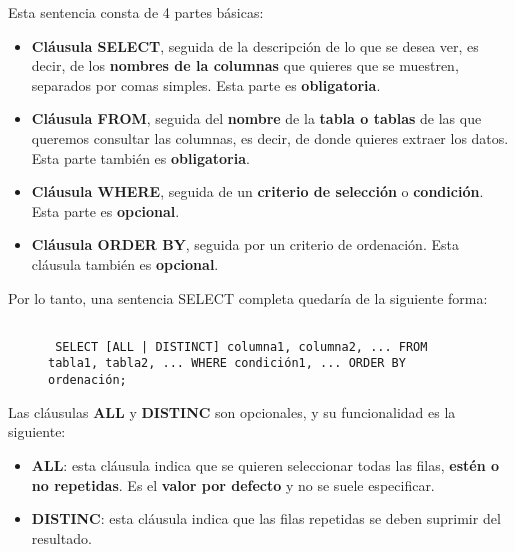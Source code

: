 Esta sentencia consta de 4 partes básicas:

\begin{itemize}
    \item \textbf{Cláusula SELECT}, seguida de la descripción de lo que se desea ver, es decir, de los \textbf{nombres de la columnas} que quieres que se muestren, separados por comas simples. Esta parte es \textbf{obligatoria}.

    \item \textbf{Cláusula FROM}, seguida del \textbf{nombre} de la \textbf{tabla o tablas} de las que queremos consultar las columnas, es decir, de donde quieres extraer los datos. Esta parte también es \textbf{obligatoria}.

    \item \textbf{Cláusula WHERE}, seguida de un \textbf{criterio de selección} o \textbf{condición}. Esta parte es \textbf{opcional}.

    \item \textbf{Cláusula ORDER BY}, seguida por un criterio de ordenación. Esta cláusula también es \textbf{opcional}.
\end{itemize}

Por lo tanto, una sentencia SELECT completa quedaría de la siguiente forma:

\begin{figure}[h]
    \begin{tcolorbox}[sharp corners, colback=yellow!30, colframe=white!20]
        \tiny
        \begin{verbatim}

 SELECT [ALL | DISTINCT] columna1, columna2, ... FROM tabla1, tabla2, ... WHERE condición1, ... ORDER BY ordenación;
        \end{verbatim}
    \end{tcolorbox}
\end{figure}

Las cláusulas \textbf{ALL} y \textbf{DISTINC} son opcionales, y su funcionalidad es la siguiente:

\begin{itemize}
    \item \textbf{ALL}: esta cláusula indica que se quieren seleccionar todas las filas, \textbf{estén o no repetidas}. Es el \textbf{valor por defecto} y no se suele especificar.

    \item \textbf{DISTINC}: esta cláusula indica que las filas repetidas se deben suprimir del resultado.
\end{itemize}

